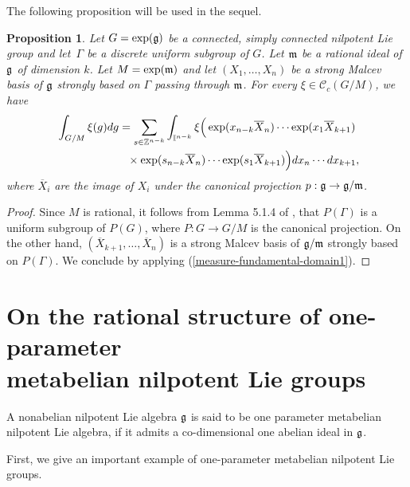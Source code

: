 \documentclass[11pt]{article}
\newtheorem{proposition}{Proposition}
\providecommand{\mathds}[1]{\mathbb{#1}}
\def\tore{{\mathbb I}}
\begin{document}
 The following
proposition will be used  in the sequel.

\begin{proposition}\label{decompositionmesure}
Let $G = \exp(\frak g)$ be a connected, simply connected nilpotent
Lie group and let~$\Gamma$ be a discrete uniform subgroup of $G$.
Let  $\frak m$ be a rational ideal of $\frak g$ of dimension $k$.
Let $M= \exp(\frak m)$ and let $(X_1, \ldots, X_n)$ be a strong
Malcev basis of $\frak g$ strongly based on $\Gamma$ passing through
$\frak m $.  For every $\xi\in \mathcal{C}_c(G/M)$, we have
\begin{gather*}%
\int_{G/M}  \xi(g)   dg   =
 \sum_{s\in \mathds{Z}^{n-k}}
\int_{\tore^{n-k}}  \xi\Big(\exp(x_{n-k} \overline{X}_n)\cdots
\exp(x_1 \overline{X}_{k+1})\\
\hphantom{\int_{G/M}  \xi(g)   dg   =}{}\times
\exp(s_{n-k} \overline{X}_n)\cdots
\exp(s_1 \overline{X}_{k+1})\Big)
   dx_n\cdots dx_{k+1},
   \end{gather*}
where $\overline{X}_i$ are the image of $X_i$ under the canonical
projection $p: \frak g\rightarrow \frak g/\frak m$.
\end{proposition}

 \begin{proof}
Since $M$ is rational, it follows  from  Lemma 5.1.4 of \cite{Cor1},
that $P(\Gamma)$ is a uniform subgroup of $P(G)$, where $P: G
\rightarrow G/M$ is the canonical projection. On the other hand,
$(\overline{X}_{k+1}, \ldots, \overline{X}_{n})$ is a strong Malcev
basis of $\frak g/\frak m$ strongly based on $P(\Gamma)$. We
conclude by applying (\ref{measure-fundamental-domain1}).
 \end{proof}



\section{On the rational structure  of
one-parameter\\ metabelian nilpotent Lie groups}\label{section4}


\begin{definition}
A nonabelian nilpotent Lie algebra  $\frak g$ is said to be one
parameter metabelian nilpotent Lie algebra, if it admits  a
co-dimensional one abelian ideal
 in $\frak g$. \end{definition}


First, we give an important example of one-parameter metabelian
nilpotent Lie groups.
\end{document}
